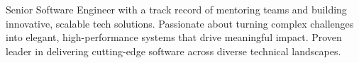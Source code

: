 

\begin{cvparagraph}

Senior Software Engineer with a track record of mentoring teams and building innovative, scalable tech solutions. Passionate about turning complex challenges into elegant, high-performance systems that drive meaningful impact. Proven leader in delivering cutting-edge software across diverse technical landscapes.
\end{cvparagraph}
